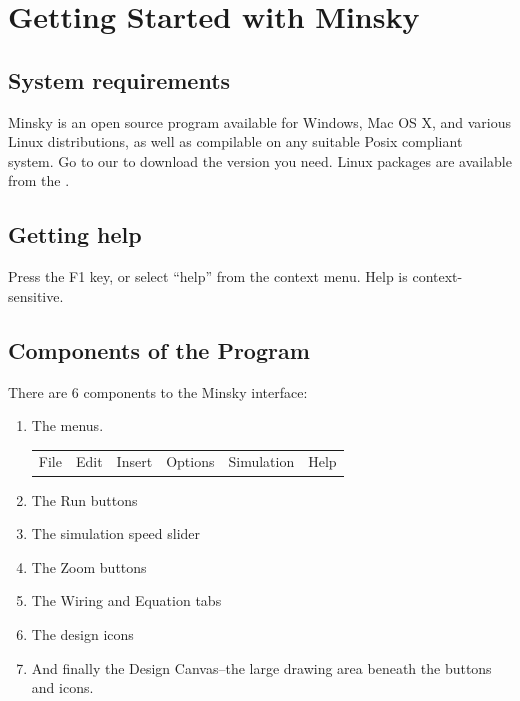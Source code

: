 
\chapter{Getting Started with Minsky}

\label{Getting-Started-Minsky} 

\section{System requirements}

Minsky is an open source program available for Windows, Mac OS X,
and various Linux distributions, as well as compilable on any suitable
Posix compliant system. Go to our  to download the version you
need. Linux packages are available from the .

\section{Getting help}

Press the F1 key, or select ``help'' from the context menu. Help
is context-sensitive.

\section{Components of the Program}

There are 6 components to the Minsky interface:
\begin{enumerate}
\item The menus.

\begin{tabular}{llllll}
File  & Edit  & Insert  & Options  & Simulation & Help \tabularnewline
\end{tabular}
\item The Run buttons

\item The simulation speed slider

\item The Zoom buttons

\item The Wiring and Equation tabs

\item The design icons

\item And finally the Design Canvas--the large drawing area beneath the
buttons and icons.

\end{enumerate}

